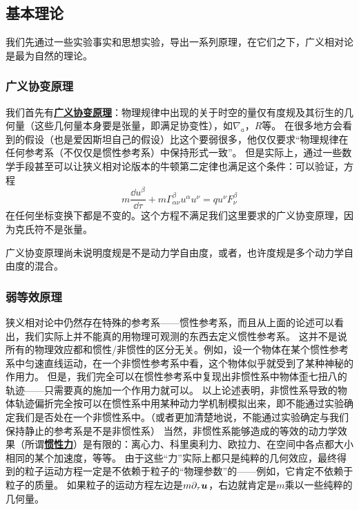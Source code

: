 \documentclass[hyperref, UTF8, a4paper]{ctexart}
\newcommand*{\concept}[1]{\underline{\textbf{#1}}}
\begin{document}
\subsection{基本理论}

我们先通过一些实验事实和思想实验，导出一系列原理，在它们之下，广义相对论是最为自然的理论。

\subsubsection{广义协变原理}

我们首先有\concept{广义协变原理}：物理规律中出现的关于时空的量仅有度规及其衍生的几何量（这些几何量本身要是张量，即满足协变性），如$\nabla_a$，$R$等。
在很多地方会看到的假设（也是爱因斯坦自己的假设）比这个要弱很多，他仅仅要求“物理规律在任何参考系（不仅仅是惯性参考系）中保持形式一致”。
但是实际上，通过一些数学手段甚至可以让狭义相对论版本的牛顿第二定律也满足这个条件：可以验证，方程
\begin{equation}
	m \frac{\dd u^{\beta}}{\dd \tau}+m \Gamma_{\alpha \nu}^{\beta} u^{\alpha} u^{\nu}=q u^{\nu} F_{\nu}^{\beta}
\end{equation}
在任何坐标变换下都是不变的。这个方程不满足我们这里要求的广义协变原理，因为克氏符不是张量。

广义协变原理尚未说明度规是不是动力学自由度，或者，也许度规是多个动力学自由度的混合。

\subsubsection{弱等效原理}

狭义相对论中仍然存在特殊的参考系——惯性参考系，而且从上面的论述可以看出，我们实际上并不能真的用物理可观测的东西去定义惯性参考系。
这并不是说所有的物理效应都和惯性/非惯性的区分无关。例如，设一个物体在某个惯性参考系中匀速直线运动，在一个非惯性参考系中看，这个物体似乎就受到了某种神秘的作用力。
但是，我们完全可以在惯性参考系中复现出非惯性系中物体歪七扭八的轨迹——只需要真的施加一个作用力就可以。
以上论述表明，非惯性系导致的物体轨迹偏折完全按可以在惯性系中用某种动力学机制模拟出来，即不能通过实验确定我们是否处在一个非惯性系中。（或者更加清楚地说，不能通过实验确定与我们保持静止的参考系是不是非惯性系）
当然，非惯性系能够造成的等效的动力学效果（所谓\concept{惯性力}）是有限的：离心力、科里奥利力、欧拉力、在空间中各点都大小相同的某个加速度，等等。
由于这些“力”实际上都只是纯粹的几何效应，最终得到的粒子运动方程一定是不依赖于粒子的“物理参数”的——例如，它肯定不依赖于粒子的质量。
如果粒子的运动方程左边是$m \partial_\tau \vb*{u}$，右边就肯定是$m$乘以一些纯粹的几何量。
\end{document}

